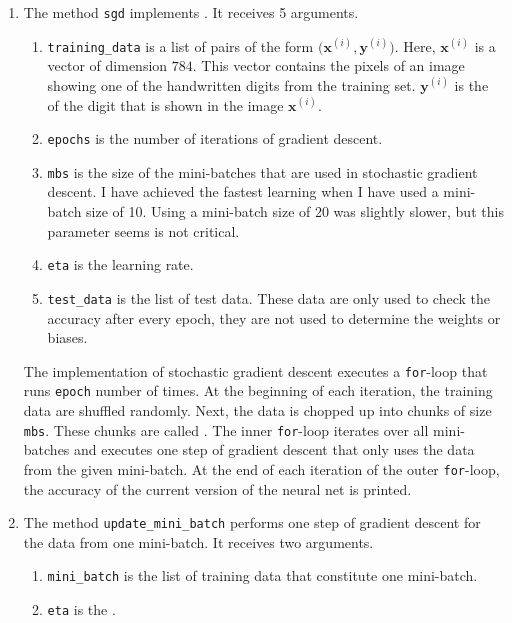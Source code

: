 \begin{enumerate}
\item The method \texttt{sgd} implements .   It receives 5 arguments.
      \begin{enumerate}
      \item \texttt{training\_data} is a list of pairs of the form $\bigl(\mathbf{x}^{(i)}, \mathbf{y}^{(i)}\bigr)$.
            Here, $\mathbf{x}^{(i)}$ is a vector of dimension $784$.  This vector contains the pixels of an image showing
            one of the handwritten digits from the training set.  $\mathbf{y}^{(i)}$ is the  of the digit
            that is shown in the image $\mathbf{x}^{(i)}$.
      \item \texttt{epochs} is the number of iterations of gradient descent.      
      \item \texttt{mbs} is the size of the mini-batches that are used in stochastic gradient descent.
            I have achieved the fastest learning when I have used a mini-batch size of 10.  Using a mini-batch size
            of 20 was slightly slower, but this parameter seems is not critical.
      \item \texttt{eta} is the learning rate.
      \item \texttt{test\_data} is the list of test data.  These data are only used to check the accuracy after
            every epoch, they are not used to determine the weights or biases.
      \end{enumerate}
      The implementation of stochastic gradient descent executes a \texttt{for}-loop that runs \texttt{epoch} number
      of times.  At the beginning of each iteration, the training data are shuffled randomly.  Next, the data is
      chopped up into chunks of size \texttt{mbs}.  These chunks are called .  The inner
      \texttt{for}-loop iterates over all mini-batches and executes one step of gradient descent that only uses the
      data from the given mini-batch.  At the end of each iteration of the outer \texttt{for}-loop, the accuracy of the
      current version of the neural net is printed.
\item The method \texttt{update\_mini\_batch} performs one step of gradient descent for the data from one mini-batch.
      It receives two arguments.
      \begin{enumerate}
      \item \texttt{mini\_batch} is the list of training data that constitute one mini-batch.
      \item \texttt{eta} is the .

\end{enumerate}
\end{enumerate}
